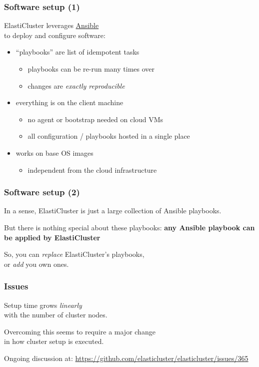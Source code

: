\documentclass[english,serif,mathserif,usenames,dvipsnames]{beamer}
\begin{document}
\begin{frame}
  \frametitle{Software setup (1)}

  ElastiCluster leverages \href{http://www.ansible.com}{Ansible} \\
  to deploy and configure software:
  \begin{itemize}
  \item ``playbooks'' are list of idempotent tasks
    \begin{itemize}
    \item playbooks can be re-run many times over
    \item changes are \textit{exactly reproducible}
    \end{itemize}

  \item everything is on the client machine
    \begin{itemize}
    \item no agent or bootstrap needed on cloud VMs
    \item all configuration / playbooks hosted in a single place
    \end{itemize}

  \item works on base OS images
    \begin{itemize}
    \item independent from the cloud infrastructure
    \end{itemize}
  \end{itemize}
\end{frame}


\begin{frame}
  \frametitle{Software setup (2)}
  In a sense, ElastiCluster is just a large collection of Ansible playbooks.

  \+ But there is nothing special about these playbooks: \textbf{any Ansible
    playbook can be applied by ElastiCluster}

  \+ So, you can \emph{replace} ElastiCluster's playbooks, \\
  or \emph{add} you own ones.
\end{frame}


\begin{frame}
  \frametitle{Issues}
  Setup time grows \emph{linearly} \\ with the number of cluster nodes.

  \+
  Overcoming this seems to require a major change \\ in how cluster setup is
  executed.

  \+
  Ongoing discussion at: \url{https://github.com/elasticluster/elasticluster/issues/365}
\end{frame}
\end{document}
